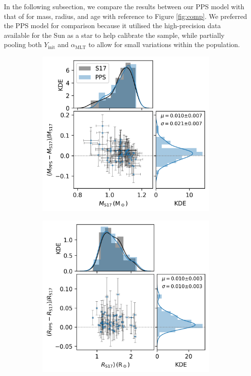 \documentclass[a4paper,fleqn,usenatbib]{mnras}
\newcommand{\mlt}{\ensuremath{{\alpha_\mathrm{MLT}}}}
\begin{document}
In the following subsection, we compare the results between our PPS model with that of  for mass, radius, and age with reference to Figure \ref{fig:comp}. We preferred the PPS model for comparison because it utilised the high-precision data available for the Sun as a star to help calibrate the sample, while partially pooling both $Y_\mathrm{init}$ and $\mlt$ to allow for small variations within the population.

\begin{figure}
    \centering
    \begin{subfigure}[b]{.33\linewidth}
        \includegraphics[width=\linewidth]{figures/mass_comp.png}
    \end{subfigure}%
    \begin{subfigure}[b]{.33\linewidth}
        \includegraphics[width=\linewidth]{figures/rad_comp.png}

\end{subfigure}
\end{figure}
\end{document}
